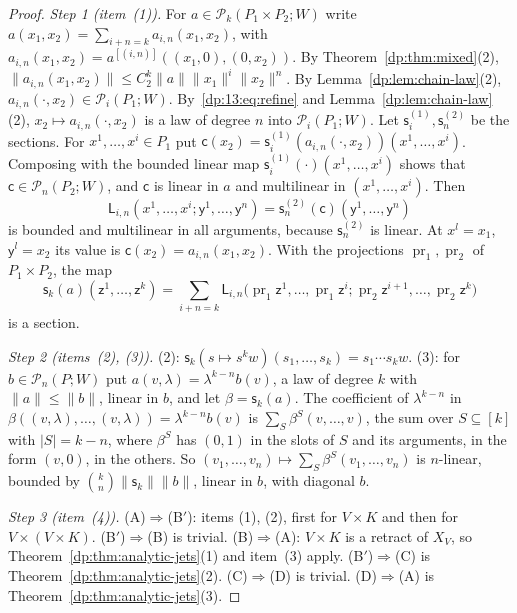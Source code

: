 \documentclass[11pt]{amsart}
\theoremstyle{definition}
\theoremstyle{remark}
\numberwithin{equation}{section}
\newcommand{\abs}[1]{\lvert #1\rvert}
\newcommand{\norm}[1]{\lVert #1\rVert}
\theoremstyle{plain}
\theoremstyle{definition}
\theoremstyle{plain}
\newcommand{\cP}{\mathcal P}
\begin{document}
\begin{proof}
\emph{Step 1 (item~(1)).} For $a\in\cP_k(P_1\times P_2;W)$ write $a(x_1,x_2)=\sum_{i+n=k}a_{i,n}(x_1,x_2)$, with $a_{i,n}(x_1,x_2)=a^{[(i,n)]}((x_1,0),(0,x_2))$. By Theorem~\ref{dp:thm:mixed}(2), $\norm{a_{i,n}(x_1,x_2)}\le C_2^k\norm a\norm{x_1}^i\norm{x_2}^n$. By Lemma~\ref{dp:lem:chain-law}(2), $a_{i,n}({\cdot},x_2)\in\cP_i(P_1;W)$. By~\eqref{dp:13:eq:refine} and Lemma~\ref{dp:lem:chain-law}(2), $x_2\mapsto a_{i,n}({\cdot},x_2)$ is a law of degree $n$ into $\cP_i(P_1;W)$. Let $\mathsf s^{(1)}_i,\mathsf s^{(2)}_n$ be the sections. For $x^1,\dots,x^i\in P_1$ put $\mathsf c(x_2)=\mathsf s^{(1)}_i(a_{i,n}({\cdot},x_2))(x^1,\dots,x^i)$. Composing with the bounded linear map $\mathsf s^{(1)}_i({\cdot})(x^1,\dots,x^i)$ shows that $\mathsf c\in\cP_n(P_2;W)$, and $\mathsf c$ is linear in $a$ and multilinear in $(x^1,\dots,x^i)$. Then
\[
 \mathsf L_{i,n}(x^1,\dots,x^i;\mathsf y^1,\dots,\mathsf y^n)=\mathsf s^{(2)}_n(\mathsf c)(\mathsf y^1,\dots,\mathsf y^n)
\]
is bounded and multilinear in all arguments, because $\mathsf s^{(2)}_n$ is linear. At $x^l=x_1$, $\mathsf y^l=x_2$ its value is $\mathsf c(x_2)=a_{i,n}(x_1,x_2)$. With the projections $\operatorname{pr}_1,\operatorname{pr}_2$ of $P_1\times P_2$, the map
\[
 \mathsf s_k(a)(\mathsf z^1,\dots,\mathsf z^k)=\sum_{i+n=k}\mathsf L_{i,n}\bigl(\operatorname{pr}_1\mathsf z^1,\dots,\operatorname{pr}_1\mathsf z^i;\operatorname{pr}_2\mathsf z^{i+1},\dots,\operatorname{pr}_2\mathsf z^k\bigr)
\]
is a section.

\emph{Step 2 (items~(2), (3)).} (2): $\mathsf s_k(s\mapsto s^kw)(s_1,\dots,s_k)=s_1\cdots s_kw$. (3): for $b\in\cP_n(P;W)$ put $a(v,\lambda)=\lambda^{k-n}b(v)$, a law of degree $k$ with $\norm a\le\norm b$, linear in $b$, and let $\beta=\mathsf s_k(a)$. The coefficient of $\lambda^{k-n}$ in $\beta((v,\lambda),\dots,(v,\lambda))=\lambda^{k-n}b(v)$ is $\sum_S\beta^S(v,\dots,v)$, the sum over $S\subseteq[k]$ with $\abs S=k-n$, where $\beta^S$ has $(0,1)$ in the slots of $S$ and its arguments, in the form $(v,0)$, in the others. So $(v_1,\dots,v_n)\mapsto\sum_S\beta^S(v_1,\dots,v_n)$ is $n$-linear, bounded by $\binom kn\norm{\mathsf s_k}\norm b$, linear in $b$, with diagonal $b$.

\emph{Step 3 (item~(4)).} (A)$\Rightarrow$(B$'$): items (1), (2), first for $V\times K$ and then for $V\times(V\times K)$. (B$'$)$\Rightarrow$(B) is trivial. (B)$\Rightarrow$(A): $V\times K$ is a retract of $X_V$, so Theorem~\ref{dp:thm:analytic-jets}(1) and item~(3) apply. (B$'$)$\Rightarrow$(C) is Theorem~\ref{dp:thm:analytic-jets}(2). (C)$\Rightarrow$(D) is trivial. (D)$\Rightarrow$(A) is Theorem~\ref{dp:thm:analytic-jets}(3).
\end{proof}
\end{document}
